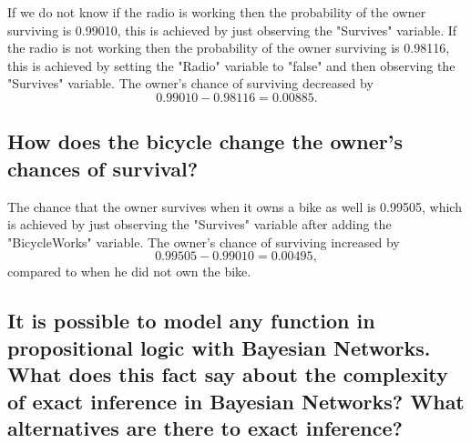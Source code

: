 \documentclass[a4paper,10pt]{article}
\begin{document}
 If we do not know if the radio is working then the probability of the owner surviving is 0.99010, this is achieved by just observing the "Survives" variable.
 If the radio is not working then the probability of the owner surviving is 0.98116, this is achieved by setting the "Radio" variable to "false" and
 then observing the "Survives" variable.
 The owner's chance of surviving decreased by 
 \begin{equation*}
	0.99010 - 0.98116 = 0.00885.
 \end{equation*} 

 \subsection{How does the bicycle change the owner's chances of survival?}

 The chance that the owner survives when it owns a bike as well is 0.99505, which is achieved by just observing the "Survives" variable after adding the
 "BicycleWorks" variable.
 The owner's chance of surviving increased by 
 \begin{equation*}
	0.99505 - 0.99010 = 0.00495,
 \end{equation*} compared to when he did not own the bike.

 \subsection{It is possible to model any function in propositional logic with Bayesian Networks. 
 What does this fact say about the complexity of exact inference in Bayesian Networks? 
 What alternatives are there to exact inference? }



 
\end{document}
